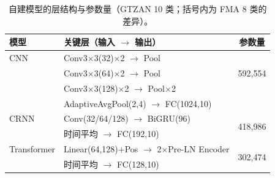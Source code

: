 \begin{table}[H]
\centering\small
\caption{自建模型的层结构与参数量（GTZAN 10 类；括号内为 FMA 8 类的差异）。}
\label{tab:arch}
\begin{tabular}{llc}
\toprule
模型 & 关键层（输入 $\rightarrow$ 输出） & 参数量\\
\midrule
CNN & Conv3$\times$3(32)$\times$2 $\rightarrow$ Pool & \multirow{3}{*}{592,554}\\
    & Conv3$\times$3(64)$\times$2 $\rightarrow$ Pool & \\
    & Conv3$\times$3(128)$\times$2 $\rightarrow$ Pool$\times$2 & \\
    & AdaptiveAvgPool(2,4) $\rightarrow$ FC(1024,10) & \\
\midrule
CRNN & Conv(32/64/128) $\rightarrow$ BiGRU(96) & \multirow{2}{*}{418,986}\\
     & 时间平均 $\rightarrow$ FC(192,10) & \\
\midrule
Transformer & Linear(64,128)+Pos $\rightarrow$ 2$\times$Pre-LN Encoder & \multirow{2}{*}{302,474}\\
            & 时间平均 $\rightarrow$ FC(128,10) & \\
\bottomrule
\end{tabular}
\end{table}
